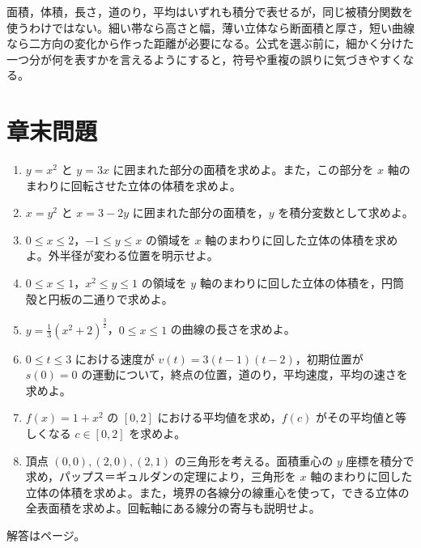 面積，体積，長さ，道のり，平均はいずれも積分で表せるが，同じ被積分関数を使うわけではない。細い帯なら高さと幅，薄い立体なら断面積と厚さ，短い曲線なら二方向の変化から作った距離が必要になる。公式を選ぶ前に，細かく分けた一つ分が何を表すかを言えるようにすると，符号や重複の誤りに気づきやすくなる。

\section*{章末問題}
\begin{enumerate}[label=\textbf{\thechapter.\arabic*},leftmargin=*]
\item\label{問:面積と円環}
$y=x^2$ と $y=3x$ に囲まれた部分の面積を求めよ。また，この部分を $x$ 軸のまわりに回転させた立体の体積を求めよ。
\item\label{問:横帯の面積}
$x=y^2$ と $x=3-2y$ に囲まれた部分の面積を，$y$ を積分変数として求めよ。
\item\label{問:外半径の交代}
$0\leq x\leq2$，$-1\leq y\leq x$ の領域を $x$ 軸のまわりに回した立体の体積を求めよ。外半径が変わる位置を明示せよ。
\item\label{問:円筒と円板}
$0\leq x\leq1$，$x^2\leq y\leq1$ の領域を $y$ 軸のまわりに回した立体の体積を，円筒殻と円板の二通りで求めよ。
\item\label{問:弧長の平方完成}
$y=\frac13(x^2+2)^{\frac32}$，$0\leq x\leq1$ の曲線の長さを求めよ。
\item\label{問:道のりと平均速度}
$0\leq t\leq3$ における速度が $v(t)=3(t-1)(t-2)$，初期位置が $s(0)=0$ の運動について，終点の位置，道のり，平均速度，平均の速さを求めよ。
\item\label{問:平均値を取る点}
$f(x)=1+x^2$ の $[0,2]$ における平均値を求め，$f(c)$ がその平均値と等しくなる $c\in[0,2]$ を求めよ。
\item\label{問:三角形と両パップス}
頂点 $(0,0),(2,0),(2,1)$ の三角形を考える。面積重心の $y$ 座標を積分で求め，パップス＝ギュルダンの定理により，三角形を $x$ 軸のまわりに回した立体の体積を求めよ。また，境界の各線分の線重心を使って，できる立体の全表面積を求めよ。回転軸にある線分の寄与も説明せよ。
\end{enumerate}

\smallskip\noindent 解答は\pageref{解答:第8章}ページ。
